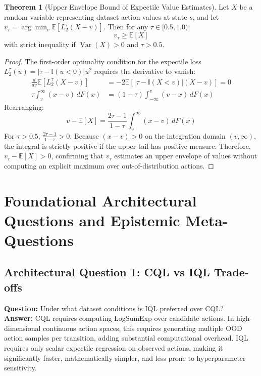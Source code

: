 \documentclass[11pt,a4paper]{article}
\theoremstyle{definition}
\newtheorem{theorem}{\textbf{Theorem}}[section]
\begin{document}
\begin{theorem}[Upper Envelope Bound of Expectile Value Estimates]
Let $X$ be a random variable representing dataset action values at state $s$, and let $v_\tau = \arg\min_v \mathbb{E}[L_2^\tau(X - v)]$.
Then for any $\tau \in [0.5, 1.0)$:
{\boldmath
\begin{equation}
v_\tau \ge \mathbb{E}[X]
\end{equation}
}
with strict inequality if $\operatorname{Var}(X) > 0$ and $\tau > 0.5$.
\end{theorem}

\begin{proof}
The first-order optimality condition for the expectile loss $L_2^\tau(u) = |\tau - \mathbb{I}(u < 0)| u^2$ requires the derivative to vanish:
{\boldmath
\begin{align}
\frac{d}{dv} \mathbb{E}[L_2^\tau(X - v)] &= -2 \mathbb{E}\left[ |\tau - \mathbb{I}(X < v)| (X - v) \right] = 0 \\
\tau \int_{v}^\infty (x - v) \, dF(x) &= (1 - \tau) \int_{-\infty}^v (v - x) \, dF(x)
\end{align}
}
Rearranging:
{\boldmath
\begin{equation}
v - \mathbb{E}[X] = \frac{2\tau - 1}{1 - \tau} \int_v^\infty (x - v) \, dF(x)
\end{equation}
}
For $\tau > 0.5$, $\frac{2\tau - 1}{1 - \tau} > 0$.
Because $(x - v) > 0$ on the integration domain $(v, \infty)$, the integral is strictly positive if the upper tail has positive measure.
Therefore, $v_\tau - \mathbb{E}[X] > 0$, confirming that $v_\tau$ estimates an upper envelope of values without computing an explicit maximum over out-of-distribution actions.
\end{proof}

\section{Foundational Architectural Questions and Epistemic Meta-Questions}

\subsection{Architectural Question 1: CQL vs IQL Trade-offs}
\textbf{Question:} Under what dataset conditions is IQL preferred over CQL?\\
\textbf{Answer:} CQL requires computing LogSumExp over candidate actions. In high-dimensional continuous action spaces, this requires generating multiple OOD action samples per transition, adding substantial computational overhead. IQL requires only scalar expectile regression on observed actions, making it significantly faster, mathematically simpler, and less prone to hyperparameter sensitivity.
\end{document}
